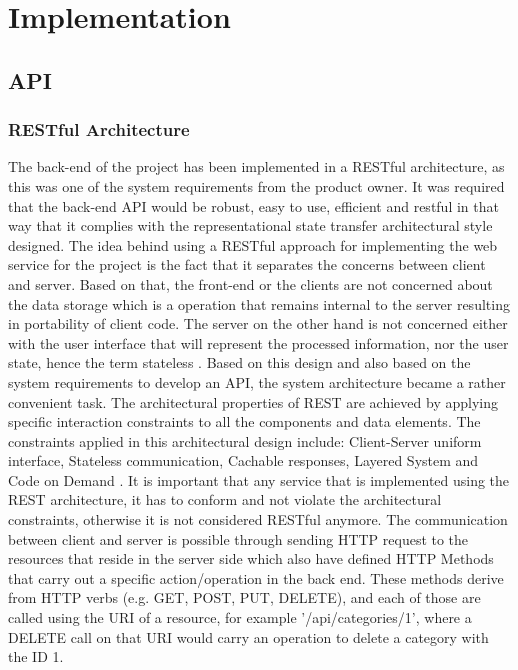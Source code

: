 \chapter{Implementation}
\label{chap:implementation}


\section{API}
\label{sec:apiImpl}
\subsection{RESTful Architecture}
The back-end of the project has been implemented in a RESTful architecture, as this was one of the system requirements from the product owner. It was required that the back-end API would be robust, easy to use, efficient and restful in that way that it complies with the representational state transfer architectural style designed. \newline 
The idea behind using a RESTful approach for implementing the web service for the project is the fact that it separates the concerns between client and server. Based on that, the front-end or the clients are not concerned about the data storage which is a operation that remains internal to the server resulting in portability of client code. The server on the other hand is not concerned either with the user interface that will represent the processed information, nor the user state, hence the term stateless \cite{RESTRef}. Based on this design and also based on the system requirements to develop an API, the system architecture became a rather convenient task. The architectural properties of REST are achieved by applying specific interaction constraints to all the components and data elements. The constraints applied in this architectural design include: Client-Server uniform interface, Stateless communication, Cachable responses, Layered System and Code on Demand \cite{RESTRef}. It is important that any service that is implemented using the REST architecture, it has to conform and not violate the architectural constraints, otherwise it is not considered RESTful anymore. The communication between client and server is possible through sending HTTP request to the  resources that reside in the server side which also have defined HTTP Methods that carry out a specific action/operation in the back end. These methods derive from HTTP verbs (e.g. GET, POST, PUT, DELETE), and each of those are called using the URI of a resource, for example '/api/categories/1', where a DELETE call on that URI would carry an operation to delete a category with the ID 1.

